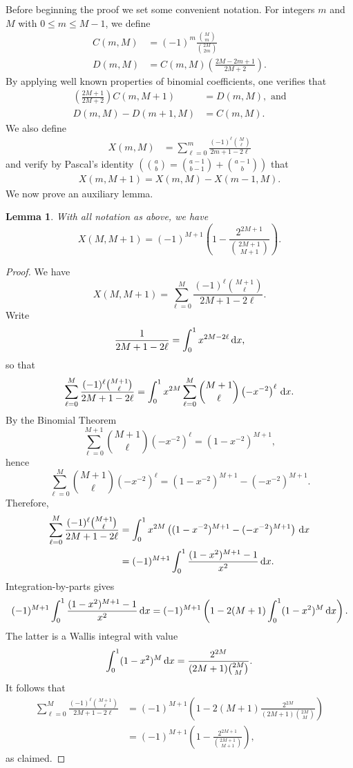 \documentclass{amsart}
\theoremstyle{plain}
\newtheorem{lem}[equation]{Lemma}
\theoremstyle{remark}
\begin{document}
Before beginning the proof we set some convenient notation.  For integers $m$ and $M$ with $0 \leq m \leq M-1$, we define
\begin{align}
C(m,M) &=(-1)^m \frac{\binom{M}{m}}{\binom{2M}{2m}} \\
D(m,M) &= C(m,M) \left(\frac{2M-2m+1}{2M+2} \right). \label{D(m,M)_definition}
\end{align}
By applying well known properties of binomial coefficients, one verifies that
\begin{align}
\left( \frac{2M+1}{2M+2} \right) C(m,M+1) &= D(m,M),\text{ and} \label{CD_identity_1} \\
D(m,M) - D(m+1,M) &= C(m,M). \label{CD_identity_2} 
\end{align}
We also define 
\begin{align}
X(m,M) &= \sum_{\ell=0}^m \frac{(-1)^{\ell} \binom{M}{\ell}}{2m+1-2\ell}
\end{align}
and verify by Pascal's identity $\left(\binom{a}{b} = \binom{a-1}{b-1} + \binom{a-1}{b}\right)$ that
\begin{align} \label{X(m,M)_identity}
X(m,M+1) = X(m,M) - X(m-1,M).
\end{align}
We now prove an auxiliary lemma.

\begin{lem} \label{X(M,M+1)_lemma}
With all notation as above, we have 
\[
X(M,M+1) = (-1)^{M+1}\left(1 - \frac{2^{2M+1}}{\binom{2M+1}{M+1}}\right).
\]
\end{lem}

\begin{proof}
We have 
\[
X(M,M+1) = \sum_{\ell = 0}^{M} \frac{(-1)^{\ell} \binom{M+1}{\ell}}{2M+1-2\ell}.
\]
Write
\[
\frac{1}{2M + 1 -2\ell} = \int_0^1 x^{2M - 2\ell} \,{\rm d}x,
\]
so that 
\[
\sum_{\ell = 0}^{M} \frac{(-1)^{\ell} \binom{M+1}{\ell}}{2M+1-2\ell} = \int_0^1 x^{2M} \sum_{\ell = 0}^{M} \binom{M+1}{\ell} \left(-x^{-2}\right)^{\ell} \, {\rm d}x.
\]
By the Binomial Theorem 
\[
\sum_{\ell = 0}^{M+1} \binom{M+1}{\ell} \left(-x^{-2}\right)^{\ell} = (1-x^{-2})^{M+1},
\]
hence
\[
 \sum_{\ell = 0}^{M} \binom{M+1}{\ell} \left(-x^{-2}\right)^{\ell}  = (1-x^{-2})^{M+1} - (-x^{-2})^{M+1}.
\]
Therefore,
\begin{align*}
\sum_{\ell = 0}^{M} \frac{(-1)^{\ell} \binom{M+1}{\ell}}{2M+1-2\ell}  &= \int_0^1 x^{2M} \left((1-x^{-2})^{M+1} - (-x^{-2})^{M+1} \right) \,{\rm d}x \\
&=(-1)^{M+1} \int_0^1 \frac{(1-x^2)^{M+1} -1}{x^2}\,{\rm d}x.
\end{align*}
Integration-by-parts gives
\[
(-1)^{M+1} \int_0^1 \frac{(1-x^2)^{M+1} -1}{x^2}\,{\rm d}x = (-1)^{M+1} \left(1-2(M+1)\int_0^1(1-x^2)^{M}\,{\rm d}x\right).
\]
The latter is a Wallis integral with value
\[
\int_0^1 (1-x^2)^{M}\,{\rm d}x = \frac{2^{2M}}{(2M+1) \binom{2M}{M}}.
\]
It follows that 
\begin{align*}
\sum_{\ell = 0}^{M} \frac{(-1)^{\ell} \binom{M+1}{\ell}}{2M+1-2\ell} &= (-1)^{M+1} \left(1-2(M+1)\frac{2^{2M}}{(2M+1) \binom{2M}{M}}\right)\\
&= (-1)^{M+1}\left(1 - \frac{2^{2M+1}}{\binom{2M+1}{M+1}}\right),
\end{align*}
as claimed.
\end{proof}
\end{document}
